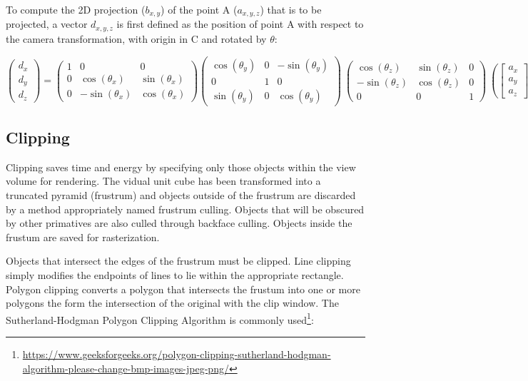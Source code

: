 \documentclass{article}
\begin{document}
To compute the 2D projection ($b_{x, y}$) of the point A ($a_{x, y, z}$) that is to be projected, a vector $d_{x, y, z}$ is first defined as the position of point A with respect to the camera transformation, with origin in C and rotated by $\theta$:

\[\begin{pmatrix}
  d_{x} \\
  d_{y} \\
  d_{z} 
 \end{pmatrix}
=
\begin{pmatrix}
  1 & 0 & 0 \\
  0 & \cos(\theta_{x}) & \sin(\theta_{x}) \\
  0 &  -\sin(\theta_{x}) & \cos(\theta_{x}) 
 \end{pmatrix}
\begin{pmatrix}
  \cos(\theta_{y}) & 0 & -\sin(\theta_{y}) \\
  0 & 1 & 0 \\
  \sin(\theta_{y}) & 0  & \cos(\theta_{y}) 
 \end{pmatrix}\
\begin{pmatrix}
  \cos(\theta_{z}) & \sin(\theta_{z})  & 0  \\
  -\sin(\theta_{z}) & \cos(\theta_{z}) & 0 \\
  0 & 0  & 1 
 \end{pmatrix}\
\left(
\begin{bmatrix}
  a_{x} \\
  a_{y} \\
  a_{z} 
\end{bmatrix}\
-
\begin{bmatrix}
  c_{x} \\
  c_{y} \\
  c_{z} 
\end{bmatrix}\
\right)\]

\subsection{Clipping}
Clipping saves time and energy by specifying only those objects within the view volume for rendering. The vidual unit cube has been transformed into a truncated pyramid (frustrum) and objects outside of the frustrum are discarded by a method appropriately named frustrum culling. Objects that will be obscured by other primatives are also culled through backface culling. Objects inside the frustum are saved for rasterization.

Objects that intersect the edges of the frustrum must be clipped. Line clipping simply modifies the endpoints of lines to lie within the appropriate rectangle. Polygon clipping converts a polygon that intersects the frustum into one or more polygons the form the intersection of the original with the clip window. The Sutherland-Hodgman Polygon Clipping Algorithm is commonly used\footnote{\url{https://www.geeksforgeeks.org/polygon-clipping-sutherland-hodgman-algorithm-please-change-bmp-images-jpeg-png/}}:
\end{document}
